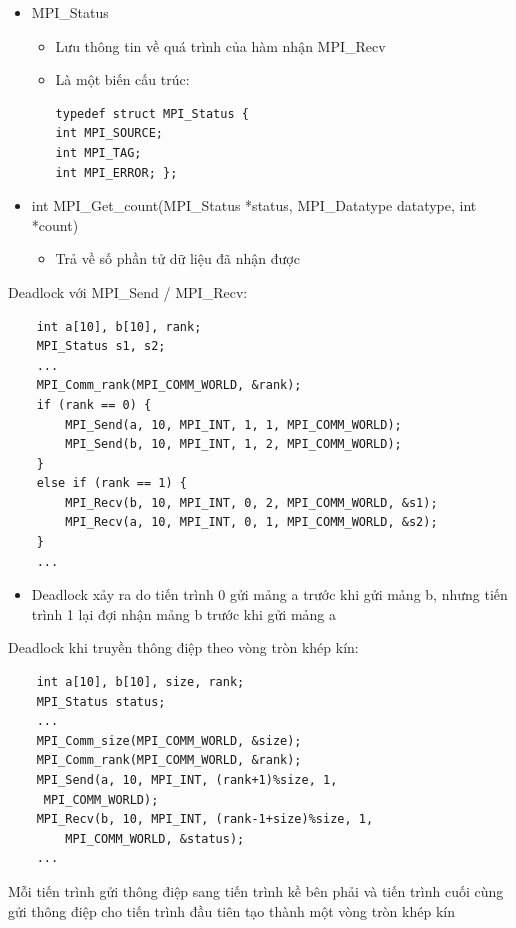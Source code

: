 \documentclass[14pt, a4paper]{article}
\numberwithin{equation}{section}
\numberwithin{figure}{section}
\numberwithin{dl}{section}
\numberwithin{md}{section}
\numberwithin{bd}{section}
\numberwithin{dn}{section}
\numberwithin{hq}{section}
\begin{document}
\begin{itemize}
    \item MPI\_Status
    \begin{itemize}
        \item Lưu thông tin về quá trình của hàm nhận MPI\_Recv
        \item Là một biến cấu trúc:
        \begin{verbatim}
typedef struct MPI_Status {
int MPI_SOURCE;
int MPI_TAG;
int MPI_ERROR; };
        \end{verbatim}
    \end{itemize}
    \item int MPI\_Get\_count(MPI\_Status *status, MPI\_Datatype datatype, int *count) 
    \begin{itemize}
        \item Trả về số phần tử dữ liệu đã nhận được 
    \end{itemize}
\end{itemize}

Deadlock với MPI\_Send / MPI\_Recv:

\begin{verbatim}
    int a[10], b[10], rank;
    MPI_Status s1, s2;
    ...
    MPI_Comm_rank(MPI_COMM_WORLD, &rank);
    if (rank == 0) {
        MPI_Send(a, 10, MPI_INT, 1, 1, MPI_COMM_WORLD);
        MPI_Send(b, 10, MPI_INT, 1, 2, MPI_COMM_WORLD);
    }
    else if (rank == 1) {
        MPI_Recv(b, 10, MPI_INT, 0, 2, MPI_COMM_WORLD, &s1);
        MPI_Recv(a, 10, MPI_INT, 0, 1, MPI_COMM_WORLD, &s2);
    }
    ...
\end{verbatim}
    
\begin{itemize}
    \item Deadlock xảy ra do tiến trình 0 gửi mảng a trước khi gửi mảng b, nhưng tiến trình 1 lại đợi nhận mảng b trước khi gửi mảng a
\end{itemize}

Deadlock khi truyền thông điệp theo vòng tròn khép kín:

\begin{verbatim}
    int a[10], b[10], size, rank;
    MPI_Status status;
    ...
    MPI_Comm_size(MPI_COMM_WORLD, &size);
    MPI_Comm_rank(MPI_COMM_WORLD, &rank);
    MPI_Send(a, 10, MPI_INT, (rank+1)%size, 1,
     MPI_COMM_WORLD);
    MPI_Recv(b, 10, MPI_INT, (rank-1+size)%size, 1,
        MPI_COMM_WORLD, &status);
    ... 
        \end{verbatim}
        Mỗi tiến trình gửi thông điệp sang tiến trình kề bên phải và tiến trình cuối cùng gửi thông điệp cho tiến trình đầu tiên tạo thành một vòng tròn khép kín
\end{document}
